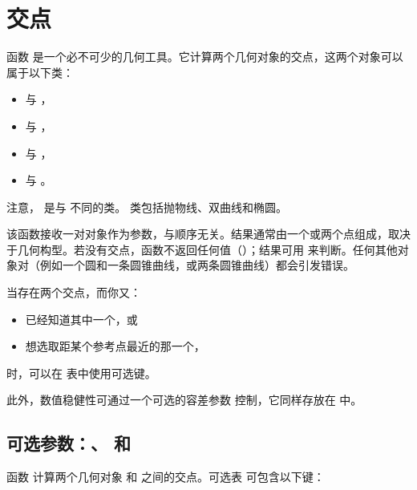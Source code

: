 \newpage
\section{交点}
\label{sec:intersections}

函数  是一个必不可少的几何工具。它计算两个几何对象的交点，这两个对象可以属于以下类：

\begin{itemize}
  \item {} 与 ，
  \item {} 与 ，
  \item {} 与 ，
  \item {} 与 。
\end{itemize}

注意， 是与  不同的类。
 类包括抛物线、双曲线和椭圆。

\medskip

该函数接收一对对象作为参数，与顺序无关。结果通常由一个或两个点组成，取决于几何构型。若没有交点，函数不返回任何值（）；结果可用  来判断。任何其他对象对（例如一个圆和一条圆锥曲线，或两条圆锥曲线）都会引发错误。

\medskip

当存在两个交点，而你又：
\begin{itemize}
  \item 已经知道其中一个，或
  \item 想选取距某个参考点最近的那一个，
\end{itemize}
时，可以在  表中使用可选键。

此外，数值稳健性可通过一个可选的容差参数  控制，它同样存放在  中。

\subsection{可选参数：、 和 }

函数  计算两个几何对象  和  之间的交点。可选表  可包含以下键：

